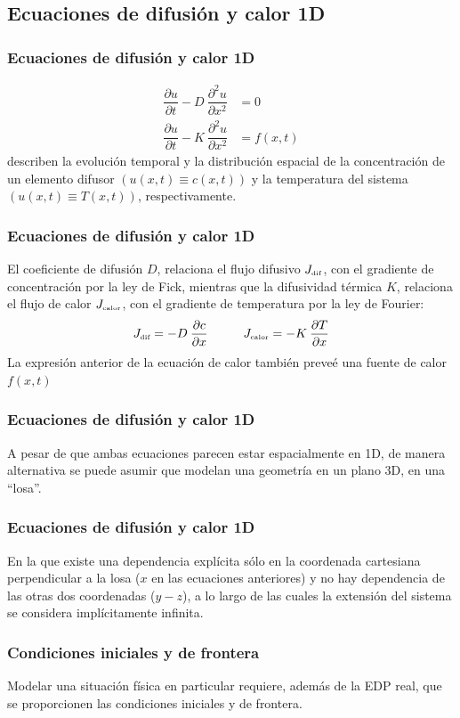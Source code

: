 \subsection{Ecuaciones de difusión y calor 1D}
\begin{frame}
\frametitle{Ecuaciones de difusión y calor 1D}
\begin{align}
\dfrac{\partial u}{\partial t} - D \: \dfrac{\partial^{2} u}{\partial x^{2}} &= 0
\label{eq:ecuacion_13_36} \\
\dfrac{\partial u}{\partial t} - K \: \dfrac{\partial^{2} u}{\partial x^{2}} &= f(x, t)
\label{eq:ecuacion_13_37}
\end{align}
describen la evolución temporal y la distribución espacial de la concentración de un elemento difusor $(u (x, t) \equiv c (x, t))$ y la temperatura del sistema $(u (x, t) \equiv T(x,t))$, respectivamente.
\end{frame}
\begin{frame}
\frametitle{Ecuaciones de difusión y calor 1D}
El coeficiente de difusión $D$, relaciona el flujo difusivo $J_{\text{\tiny{dif}}}$, con el gradiente de concentración por la ley de Fick, mientras que la difusividad térmica $K$, relaciona el flujo de calor $J_{\text{\tiny{calor}}}$, con el gradiente de temperatura por la ley de Fourier:
\[ J_{\text{\tiny{dif}}} = - D \: \dfrac{\partial c}{\partial x} \hspace{1cm}  J_{\text{\tiny{calor}}} = - K \: \dfrac{\partial T}{\partial x} \]
La expresión anterior de la ecuación de calor también preveé una fuente de calor $f(x, t)$
\end{frame}
\begin{frame}
\frametitle{Ecuaciones de difusión y calor 1D}
A pesar de que ambas ecuaciones parecen estar espacialmente en 1D, de manera alternativa se puede asumir que modelan una geometría en un plano 3D, en una \enquote{losa}.
\end{frame}
\begin{frame}
\frametitle{Ecuaciones de difusión y calor 1D}
En la que existe una dependencia explícita sólo en la coordenada cartesiana perpendicular a la losa ($x$ en las ecuaciones anteriores) y no hay dependencia de las otras dos coordenadas ($y-z$), a lo largo de las cuales la extensión del sistema se considera implícitamente infinita.
\end{frame}
\begin{frame}
\frametitle{Condiciones iniciales y de frontera}
Modelar una situación física en particular requiere, además de la EDP real, que se proporcionen las condiciones iniciales y de frontera.
\end{frame}
